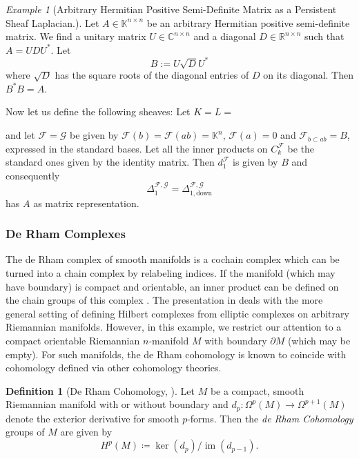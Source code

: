 \documentclass[11pt]{article}
\theoremstyle{definition}
\newtheorem{definition}[theorem]{Definition}
\theoremstyle{remark}
\newtheorem{example}[theorem]{Example}
\DeclareMathOperator{\im}{im}
\newcommand{\Ff}{\mathcal{F}}
\newcommand{\Gg}{\mathcal{G}}
\newcommand{\R}{\mathbb{R}}
\newcommand{\IK}{\mathbb{K}}
\newcommand{\IC}{\mathbb{C}}
\begin{document}
\begin{example}[Arbitrary Hermitian Positive Semi-Definite Matrix as a Persistent Sheaf Laplacian.]
    Let $A \in \IK^{n \times n}$ be an arbitrary Hermitian positive semi-definite matrix. We find a unitary matrix $U \in \IC^{n \times n}$ and a diagonal $D \in \R^{n \times n}$ such that $A=UDU^*$. Let
    $$
        B:=U\sqrt D U^*
    $$
    where $\sqrt D$ has the square roots of the diagonal entries of $D$ on its diagonal. Then $B^* B=A$.
    
    Now let us define the following sheaves: Let $K=L=$ 
    and let $\Ff=\Gg$ be given by $\Ff(b)=\Ff(ab)=\IK^n$, $\Ff(a)=0$ and $\Ff_{b \subset ab}=B$, expressed in the standard bases. Let all the inner products on $C_k^\Ff$ be the standard ones given by the identity matrix. Then $d_1^\Ff$ is given by $B$ and consequently 
    $$
    \Delta_{1}^{\Ff,\Gg}=\Delta_{1,\text{down}}^{\Ff,\Gg}
    $$
    has $A$ as matrix representation.
\end{example}

\subsubsection{De Rham Complexes} \label{subsub:derham}

The de Rham complex of smooth manifolds is a cochain complex \citep[see][\S17]{lee} which can be turned into a chain complex by relabeling indices. If the manifold (which may have boundary) is compact and orientable, an inner product can be defined on the chain groups of this complex \citep[see][\S1.2 and 2.6]{schwarz}. The presentation in \citet[\S3]{Hilbert} deals with the more general setting of defining Hilbert complexes from elliptic complexes on arbitrary Riemannian manifolds. However, in this example, we restrict our attention to a compact orientable Riemannian $n$-manifold $M$ with boundary $\partial M$ (which may be empty). For such manifolds, the de Rham cohomology is known to coincide with cohomology defined via other cohomology theories.

\begin{definition}[\textnormal{De Rham Cohomology, \citet[\S17]{lee}}]
    Let $M$ be a compact, smooth Riemannian manifold with or without boundary and $d_p:\Omega^p(M) \to \Omega^{p+1}(M)$ denote the exterior derivative for smooth $p$-forms. Then the \emph{de Rham Cohomology} groups of $M$ are given by
    $$
        H^p(M) \coloneqq \ker(d_p)\big/ \im(d_{p-1}). %
    $$
\end{definition}
\end{document}

